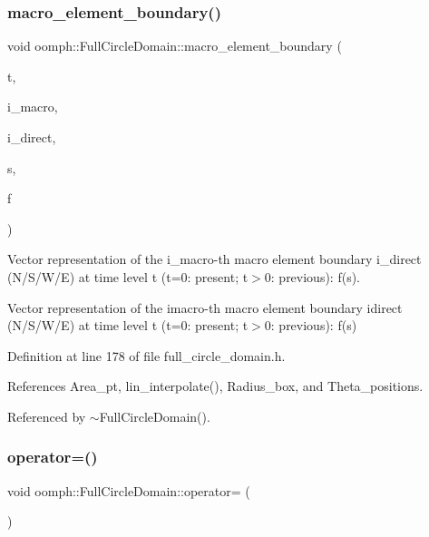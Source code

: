 \subsubsection{\texorpdfstring{macro\+\_\+element\+\_\+boundary()}{macro\_element\_boundary()}}
{\footnotesize\ttfamily void oomph\+::\+Full\+Circle\+Domain\+::macro\+\_\+element\+\_\+boundary (\begin{DoxyParamCaption}\item[{const unsigned \&}]{t,  }\item[{const unsigned \&}]{i\+\_\+macro,  }\item[{const unsigned \&}]{i\+\_\+direct,  }\item[{const Vector$<$ double $>$ \&}]{s,  }\item[{Vector$<$ double $>$ \&}]{f }\end{DoxyParamCaption})}



Vector representation of the i\+\_\+macro-\/th macro element boundary i\+\_\+direct (N/\+S/\+W/E) at time level t (t=0\+: present; t$>$0\+: previous)\+: f(s). 

Vector representation of the imacro-\/th macro element boundary idirect (N/\+S/\+W/E) at time level t (t=0\+: present; t$>$0\+: previous)\+: f(s) 

Definition at line 178 of file full\+\_\+circle\+\_\+domain.\+h.



References Area\+\_\+pt, lin\+\_\+interpolate(), Radius\+\_\+box, and Theta\+\_\+positions.



Referenced by $\sim$\+Full\+Circle\+Domain().

\mbox{\label{classoomph_1_1FullCircleDomain_a9293b7e09e37a9bc3cc4e495e6a22587}} 
\subsubsection{\texorpdfstring{operator=()}{operator=()}}
{\footnotesize\ttfamily void oomph\+::\+Full\+Circle\+Domain\+::operator= (\begin{DoxyParamCaption}\item[{const \hyperlink{classoomph_1_1FullCircleDomain}{Full\+Circle\+Domain} \&}]{ }\end{DoxyParamCaption})\hspace{0.3cm}{\ttfamily [inline]}}



